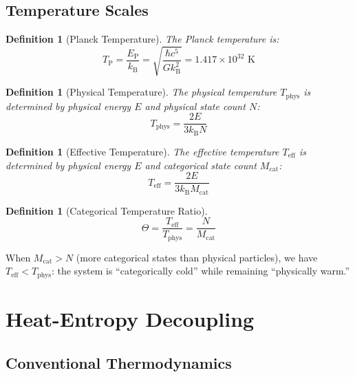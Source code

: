 \documentclass[twocolumn,10pt,twoside]{article}
\newtheorem{definition}[theorem]{Definition}
\newcommand{\kb}{k_{\mathrm{B}}}
\newcommand{\Ep}{E_{\mathrm{P}}}
\newcommand{\Tp}{T_{\mathrm{P}}}
\newcommand{\Teff}{T_{\mathrm{eff}}}
\newcommand{\Tphys}{T_{\mathrm{phys}}}
\newcommand{\Mcat}{M_{\mathrm{cat}}}
\begin{document}
\subsection{Temperature Scales}

\begin{definition}[Planck Temperature]
The Planck temperature is:
\begin{equation}
\Tp = \frac{\Ep}{\kb} = \sqrt{\frac{\hbar c^5}{G \kb^2}} = 1.417 \times 10^{32} \text{ K}
\end{equation}
\end{definition}

\begin{definition}[Physical Temperature]
The physical temperature $\Tphys$ is determined by physical energy $E$ and physical state count $N$:
\begin{equation}
\Tphys = \frac{2E}{3\kb N}
\end{equation}
\end{definition}

\begin{definition}[Effective Temperature]
The effective temperature $\Teff$ is determined by physical energy $E$ and categorical state count $\Mcat$:
\begin{equation}
\Teff = \frac{2E}{3\kb \Mcat}
\end{equation}
\end{definition}

\begin{definition}[Categorical Temperature Ratio]
\begin{equation}
\Theta = \frac{\Teff}{\Tphys} = \frac{N}{\Mcat}
\end{equation}
\end{definition}

When $\Mcat > N$ (more categorical states than physical particles), we have $\Teff < \Tphys$: the system is ``categorically cold'' while remaining ``physically warm.''

\section{Heat-Entropy Decoupling}

\subsection{Conventional Thermodynamics}
\end{document}
